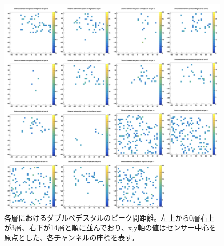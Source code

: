 \begin{figure}[H]
\begin{center}
 \includegraphics[keepaspectratio, scale=0.45]
 	{Figure/Beamtest/dpmap.png}
 		\caption{各層におけるダブルペデスタルのピーク間距離。左上から0層右上が3層、右下が14層と順に並んでおり、x,y軸の値はセンサー中心を原点とした、各チャンネルの座標を表す。}
		\label{dpmap}
\end{center}
\end{figure}
